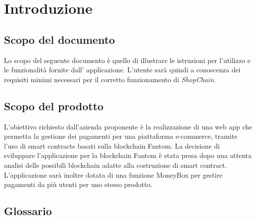 \section{Introduzione}\label{section:introduzione}

\subsection{Scopo del documento}
Lo scopo del seguente documento è quello di illustrare le istruzioni per l'utilizzo e le funzionalità fornite dall' applicazione.
L'utente sarà quindi a conoscenza dei requisiti minimi necessari per il corretto funzionamento di \textit{ShopChain}.

\subsection{Scopo del prodotto}
L'obiettivo richiesto dall'azienda proponente è la realizzazione di una web app\glo{} che permetta la gestione dei pagamenti per una piattaforma e-commerce\glo{}, tramite l'uso di smart contracts\glo{} basati sulla blockchain\glo{} Fantom\glo{}.
La decisione di sviluppare l'applicazione per la blockchain\glo{} Fantom\glo{} è stata presa dopo una attenta analisi delle possibili blockchain\glo{} adatte alla costruzione di smart contract\glo{}.
L'applicazione sarà inoltre dotata di una funzione MoneyBox\glo{} per gestire pagamenti da più utenti per uno stesso prodotto.

\subsection{Glossario}
\gloDesc{}